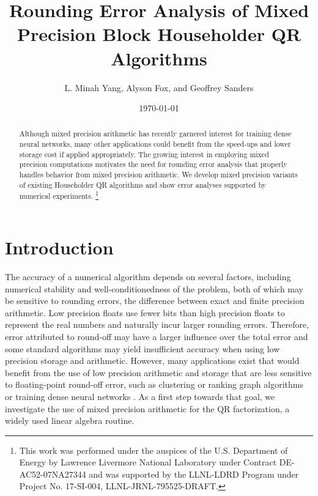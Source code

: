 \documentclass[review,onefignum,onetabnum]{siamart190516}
\title{Rounding Error Analysis of Mixed Precision Block Householder QR Algorithms}
\author{L. Minah Yang, Alyson Fox, and Geoffrey Sanders}
\date{\today}
\newcommand\blfootnote[1]{%
	\begingroup
	\renewcommand\thefootnote{}\footnote{#1}%
	\addtocounter{footnote}{-1}%
	\endgroup
}
\begin{document}
\maketitle
\begin{abstract}
	Although mixed precision arithmetic has recently garnered interest for training dense neural networks, many other applications could benefit from the  speed-ups and lower storage cost if applied appropriately. 
	The growing interest in employing mixed precision computations motivates the need for rounding error analysis that properly handles behavior from mixed precision arithmetic.
	We develop mixed precision variants of existing Householder QR algorithms and show error analyses supported by numerical experiments.	\blfootnote{This work was performed under the auspices of the U.S. Department of Energy by Lawrence Livermore National Laboratory under Contract DE-AC52-07NA27344 and was supported by the LLNL-LDRD Program under Project No. 17-SI-004, LLNL-JRNL-795525-DRAFT.}
\end{abstract}
\section{Introduction}\label{sec:intro}
%
The accuracy of a numerical algorithm depends on several factors, including numerical stability and well-conditionedness of the problem, both of which may be sensitive to rounding errors, the difference between exact and finite precision arithmetic. 
Low precision floats use fewer bits than high precision floats to represent the real numbers and naturally incur larger rounding errors. 
Therefore, error attributed to round-off may have a larger influence over the total error and some standard algorithms may yield insufficient accuracy when using low precision storage and arithmetic.
However, many applications exist that would benefit from the use of low precision arithmetic and storage that are less sensitive to floating-point round-off error, such as clustering or ranking graph algorithms \cite{vonLuxburg2007} or training dense neural networks \cite{micikevicius2018mixed}.
As a first step towards that goal, we investigate the use of mixed precision arithmetic for the QR factorization, a widely used linear algebra routine.
\par
\end{document}

